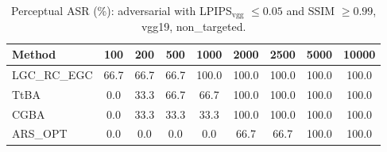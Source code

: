 \begin{table}[t]
\centering\footnotesize
\caption{Perceptual ASR (\%): adversarial with LPIPS$_{\mathrm{vgg}}$ $\le 0.05$ and SSIM $\ge 0.99$, vgg19, non\_targeted.}
\begin{tabular}{lcccccccc}
\toprule
Method & 100 & 200 & 500 & 1000 & 2000 & 2500 & 5000 & 10000 \\
\midrule
LGC\_RC\_EGC & 66.7 & 66.7 & 66.7 & 100.0 & 100.0 & 100.0 & 100.0 & 100.0 \\
TtBA & 0.0 & 33.3 & 66.7 & 66.7 & 100.0 & 100.0 & 100.0 & 100.0 \\
CGBA & 0.0 & 33.3 & 33.3 & 33.3 & 100.0 & 100.0 & 100.0 & 100.0 \\
ARS\_OPT & 0.0 & 0.0 & 0.0 & 0.0 & 66.7 & 66.7 & 100.0 & 100.0 \\
\bottomrule
\end{tabular}
\end{table}
